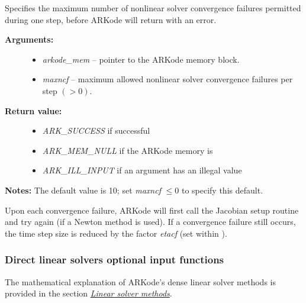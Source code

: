\documentclass[letterpaper,10pt,english]{sphinxmanual}
\begin{document}
\begin{fulllineitems}
\label{c_interface/User_callable:ARKodeSetMaxConvFails}
Specifies the maximum number of nonlinear solver
convergence failures permitted during one step, before ARKode will
return with an error.
\begin{description}
\item[{\textbf{Arguments:}}] \leavevmode\begin{itemize}
\item {} 
\emph{arkode\_mem} -- pointer to the ARKode memory block.

\item {} 
\emph{maxncf} -- maximum allowed nonlinear solver convergence failures
per step $(>0)$.

\end{itemize}

\item[{\textbf{Return value:}}] \leavevmode\begin{itemize}
\item {} 
\emph{ARK\_SUCCESS} if successful

\item {} 
\emph{ARK\_MEM\_NULL} if the ARKode memory is 

\item {} 
\emph{ARK\_ILL\_INPUT} if an argument has an illegal value

\end{itemize}

\end{description}

\textbf{Notes:} The default value is 10; set \emph{maxncf} $\le 0$
to specify this default.

Upon each convergence failure, ARKode will first call the Jacobian
setup routine and try again (if a Newton method is used).  If a
convergence failure still occurs, the time step size is reduced by
the factor \emph{etacf} (set within {\hyperref[c_interface/User_callable:ARKodeSetMaxCFailGrowth]{}}).

\end{fulllineitems}



\subsubsection{Direct linear solvers optional input functions}
\label{c_interface/User_callable:cinterface-arkdlsinputs}\label{c_interface/User_callable:direct-linear-solvers-optional-input-functions}
The mathematical explanation of ARKode's dense linear solver methods
is provided in the section {\hyperref[Mathematics:mathematics-linear]{\emph{Linear solver methods}}}.
\end{document}
